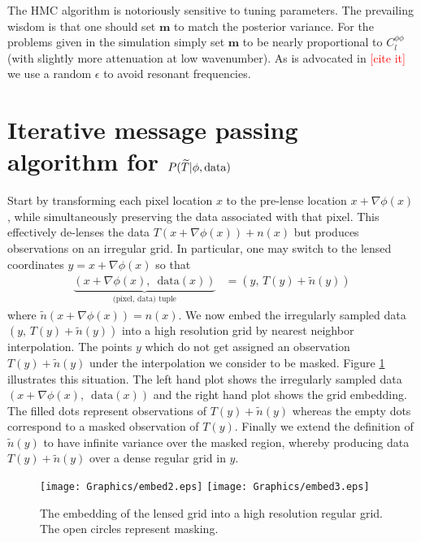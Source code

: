 \documentclass[noinfoline]{imsart}
\newcommand{\bs}{\boldsymbol}
\begin{document}
The HMC algorithm is notoriously sensitive to tuning parameters. 
The prevailing wisdom is that one should set $\bs m$ to match the posterior variance. For the problems given in the simulation simply set  $\bs m$ to be nearly proportional  to $C_l^{\phi\phi}$ (with slightly more attenuation at low wavenumber).  As is advocated in \textcolor{red}{[cite it]} we  use a random $\epsilon$ to avoid resonant frequencies.

%
%
\section{Iterative message passing algorithm for $ P(\widetilde T |  \phi,\text{\rm data})$}
\label{Section: iterative message passing section}



Start by  transforming each pixel location $x$ to the pre-lense location $x+\nabla \phi(x)$, while simultaneously preserving the data associated with that pixel. This  effectively de-lenses the data $ T(x+\nabla \phi(x))+n(x)$ but produces observations on an irregular grid. In particular, one may switch to the lensed coordinates $y = x+\nabla\phi(x)$ so that
\begin{align}
\nonumber
\underbrace{(x +\nabla \phi(x),\, \text{ data}(x))}_{\text{(pixel, data) tuple}} & = (y, \, T(y) + \tilde n(y)) 
\end{align}
where $\tilde n(x+\nabla\phi(x))=n(x)$.  We now embed the irregularly sampled data $(y, \, T(y) + \tilde n(y))$ into a high resolution grid by nearest neighbor interpolation. The points $y$ which do not get assigned an observation $T(y)+\tilde n(y)$ under the interpolation we consider to be masked. 
Figure \ref{embed} illustrates this situation. The left hand plot shows the irregularly sampled data $(x +\nabla \phi(x),\, \text{ data}(x))$ and the right hand plot shows the grid embedding. The filled dots represent observations of $T(y) + \tilde n(y)$ whereas the empty dots correspond to a masked observation of $T(y)$. 
Finally we extend the definition of $\tilde n(y)$ to have infinite variance over the masked region, whereby producing data $T(y)+\tilde n(y)$ over a dense regular grid in $y$.




\begin{figure}[H]
{\texttt{[image: Graphics/embed2.eps]}}%
{\texttt{[image: Graphics/embed3.eps]}}
\caption{The embedding of the lensed grid into a high resolution regular grid. The open circles represent masking.}
\label{embed}
\end{figure}
\end{document}
